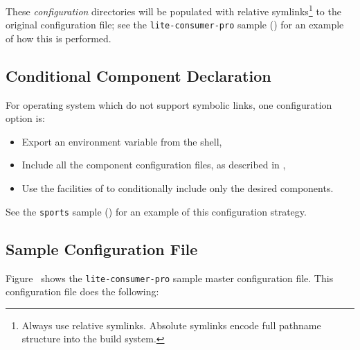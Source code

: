 These \emph{configuration} directories will be populated with relative
symlinks\footnote{Always use relative symlinks.  Absolute symlinks
  encode full pathname structure into the build system.} to the
original configuration file; see the \texttt{lite-consumer-pro} sample
() for an example of how this is
performed.

\subsection{Conditional Component Declaration}

For operating system which do not support symbolic links, one
configuration option is:

\begin{itemize}
\item Export an environment variable from the shell,
\item Include all the component configuration files, as described in
  ,
\item Use the facilities of \gnumake to conditionally include only the
  desired components.
\end{itemize}

See the \texttt{sports} sample () for an example
of this configuration strategy.

\subsection{Sample Configuration File}
Figure~ shows the
\texttt{lite-consumer-pro} sample master configuration file.  This
configuration file does the following:


